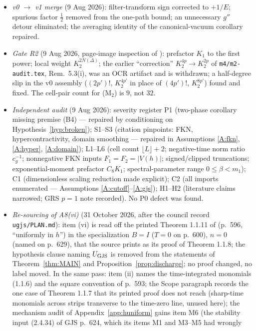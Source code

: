 \documentclass[11pt,a4paper]{article}
\theoremstyle{plain}
\theoremstyle{definition}
\theoremstyle{plain}
\theoremstyle{definition}
\begin{document}
\begin{itemize}
\item \emph{v0 $\to$ v1 merge} (9 Aug 2026): filter-transform sign corrected to $+1/E$;
spurious factor $\tfrac12$ removed from the one-path bound; an unnecessary $g''$ detour
eliminated; the averaging identity of the canonical-vacuum corollary repaired.
\item \emph{Gate R2} (9 Aug 2026, page-image inspection of \cite[p.~594]{GJS}): prefactor
$K_1$ to the first power; local weight $K_2^{2N(\Delta)}$; the earlier ``correction''
$K_2^{4p}\to K_2^{2p}$ of \texttt{m4/m2-audit.tex}, Rem.~5.3(i), was an OCR artifact and is
withdrawn; a half-degree slip in the v0 assembly ($(2p')!$, $K_2^{4p'}$ in place of %
$(4p')!$, $K_2^{8p'}$) found and fixed. The cell-pair count for (M$_2$) is $9$, not $32$.
\item \emph{Independent audit} (9 Aug 2026): severity register
P1 (two-phase corollary missing premise (B4) --- repaired by conditioning on
Hypothesis~\ref{hyp:broken}); S1--S3 (citation pinpoints: FKN, hypercontractivity, domain
smoothing --- repaired in Assumptions \ref{A:fkn}, \ref{A:hyper}, \ref{A:domain});
L1--L6 (cell count $\lfloor L\rfloor+2$; negative-time norm ratio $c_g^{-1}$; nonnegative
FKN inputs $F_1=F_2=|V(h)|$; signed/clipped truncations; exponential-moment prefactor
$C_8K_1$; spectral-parameter range $0\le\beta<m_1$); C1 (dimensionless scaling reduction
made explicit); C2 (all imports enumerated --- Assumptions \ref{A:cutoff}--\ref{A:gjs});
H1--H2 (literature claims narrowed; GRS $p=1$ note recorded). No P0 defect was found.
\item \emph{Re-sourcing of A8(vi)} (31 October 2026, after the council record
\texttt{ugjs/PLAN.md}): item (vi) is read off the printed Theorem 1.1.11 of \cite{GJS}
(p.~596, ``uniformly in $h$'') in the specialization $B=I$ ($T=0$ on p.~600), $n=0$ (named
on p.~629), that the source prints as its proof of Theorem 1.1.8; the hypothesis clause naming $U_{\rm GJS}$ is
removed from the statements of Theorem~\ref{thm:MAIN} and Proposition~\ref{prop:discharge};
no proof changed, no label moved.  In the same pass: item (ii) names the time-integrated monomials (1.1.6) and the
square convention of p.~593; the Scope paragraph records the one case of Theorem 1.1.7 that
its printed proof does not reach (sharp-time monomials across strips transverse to the
time-zero line, unused here); the mechanism audit of Appendix~\ref{app:huniform} gains item
M6 (the stability input (2.4.34) of GJS p.~624, which its items M1 and M3--M5 had wrongly

\end{itemize}
\end{document}

